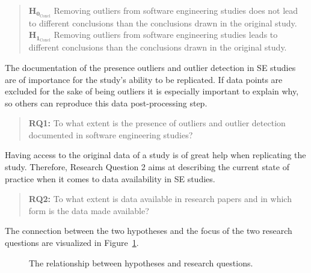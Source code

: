 \begin{quote}
$\mathbf{H_{0_{\mathrm{Concl}}}}$ Removing outliers from software engineering studies does not lead to different conclusions than the conclusions drawn in the original study. 
\\$\mathbf{H_{1_{\mathrm{Concl}}}}$  Removing outliers from software engineering studies leads to different conclusions than the conclusions drawn in the original study.
\end{quote}


The documentation of the presence outliers and outlier detection in SE studies are of importance for the study's ability to be replicated. If data points are excluded for the sake of being outliers it is especially important to explain why, so others can reproduce this data post-processing step.


\begin{quote}
\textbf{RQ1:} To what extent is the presence of outliers and outlier detection documented in software engineering studies?
\end{quote}


Having access to the original data of a study is of great help when replicating the study. Therefore, Research Question 2 aims at describing the current state of practice when it comes to data availability in SE studies. 


\begin{quote}
\textbf{RQ2:} To what extent is data available in research papers and in which form is the data made available?
\end{quote}


The connection between the two hypotheses and the focus of the two research questions are visualized in Figure~\ref{fig:intro-hypo}.


\begin{figure}
\centering
\caption{The relationship between hypotheses and research questions. }
\label{fig:intro-hypo}

\end{figure}
